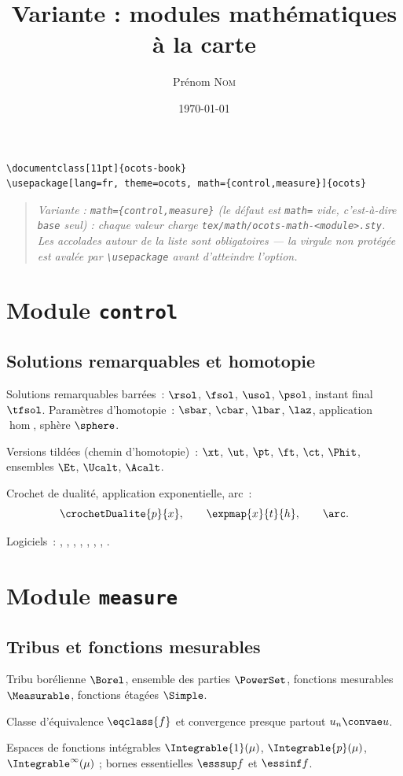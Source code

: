 \documentclass[11pt]{ocots-book}
\title{Variante : modules mathématiques à la carte}
\author{Prénom \textsc{Nom}}
\date{\today}
\newcommand{\ocotsvariantnote}[1]{\begin{quote}\itshape Variante : #1\end{quote}}
\begin{document}
\begin{lstlisting}
\documentclass[11pt]{ocots-book}
\usepackage[lang=fr, theme=ocots, math={control,measure}]{ocots}
\end{lstlisting}
\ocotsvariantnote{\texttt{math=\{control,measure\}} (le défaut est
\texttt{math=} vide, c'est-à-dire \texttt{base} seul) : chaque valeur charge
\texttt{tex/math/ocots-math-<module>.sty}. Les accolades autour de la liste
sont obligatoires — la virgule non protégée est avalée par
\texttt{\textbackslash usepackage} avant d'atteindre l'option.}

\chapter{Module \texttt{control}}
\section{Solutions remarquables et homotopie}

Solutions remarquables barrées~: $\rsol$, $\fsol$, $\usol$, $\psol$, instant
final $\tfsol$. Paramètres d'homotopie~: $\sbar$, $\cbar$, $\lbar$, $\laz$,
application $\hom$, sphère $\sphere$.

Versions tildées (chemin d'homotopie)~: $\xt$, $\ut$, $\pt$, $\ft$, $\ct$,
$\Phit$, ensembles $\Et$, $\Ucalt$, $\Acalt$.

Crochet de dualité, application exponentielle, arc~:
\[
    \crochetDualite{p}{x}, \qquad \expmap{x}{t}{h}, \qquad \arc.
\]

Logiciels~: \hampath, \bocop, \cotcot, \nutopy, \controltoolbox, \tapenade,
\lapack, \minpack.

\chapter{Module \texttt{measure}}
\section{Tribus et fonctions mesurables}

Tribu borélienne $\Borel$, ensemble des parties $\PowerSet$, fonctions
mesurables $\Measurable$, fonctions étagées $\Simple$.

Classe d'équivalence $\eqclass{f}$ et convergence presque partout
$u_n \convae u$.

Espaces de fonctions intégrables $\Integrable{1}(\mu)$, $\Integrable{p}(\mu)$,
\resp $\Integrable^\infty(\mu)$ ; bornes essentielles $\esssup f$ et
$\essinf f$.
\end{document}
